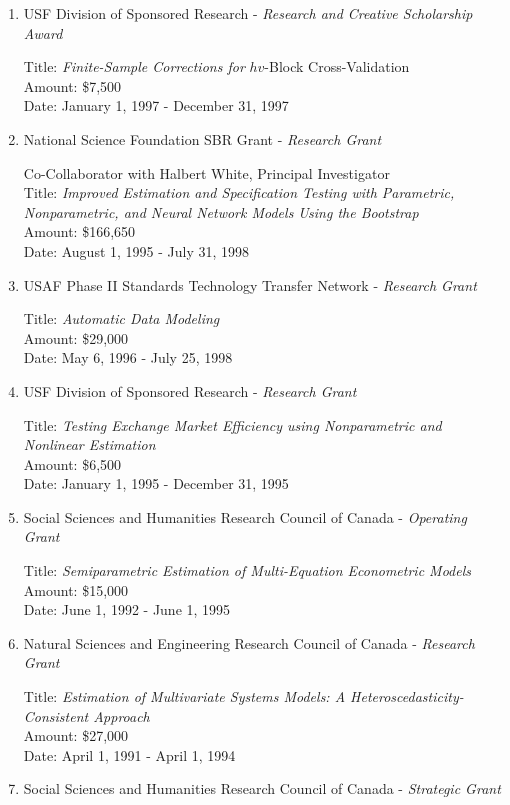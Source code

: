 \documentclass[
]{article}
\begin{document}
\begin{enumerate}
  Title: \emph{Density-Based Multinomial Choice - Theory and
  Applications}\\
  Amount: \$7,500\\
  Date: January 1, 1999 - December 31, 1999
\item
  USF Division of Sponsored Research - \emph{Research and Creative
  Scholarship Award}

  Title: \emph{Finite-Sample Corrections for} \(hv\)-Block
  Cross-Validation\\
  Amount: \$7,500\\
  Date: January 1, 1997 - December 31, 1997
\item
  National Science Foundation SBR Grant - \emph{Research Grant}

  Co-Collaborator with Halbert White, Principal Investigator\\
  Title: \emph{Improved Estimation and Specification Testing with
  Parametric, Nonparametric, and Neural Network Models Using the
  Bootstrap}\\
  Amount: \$166,650\\
  Date: August 1, 1995 - July 31, 1998
\item
  USAF Phase II Standards Technology Transfer Network - \emph{Research
  Grant}

  Title: \emph{Automatic Data Modeling}\\
  Amount: \$29,000\\
  Date: May 6, 1996 - July 25, 1998
\item
  USF Division of Sponsored Research - \emph{Research Grant}

  Title: \emph{Testing Exchange Market Efficiency using Nonparametric
  and Nonlinear Estimation}\\
  Amount: \$6,500\\
  Date: January 1, 1995 - December 31, 1995
\item
  Social Sciences and Humanities Research Council of Canada -
  \emph{Operating Grant}

  Title: \emph{Semiparametric Estimation of Multi-Equation Econometric
  Models}\\
  Amount: \$15,000\\
  Date: June 1, 1992 - June 1, 1995
\item
  Natural Sciences and Engineering Research Council of Canada -
  \emph{Research Grant}

  Title: \emph{Estimation of Multivariate Systems Models: A
  Heteroscedasticity-Consistent Approach}\\
  Amount: \$27,000\\
  Date: April 1, 1991 - April 1, 1994
\item
  Social Sciences and Humanities Research Council of Canada -
  \emph{Strategic Grant}


\end{enumerate}
\end{document}
